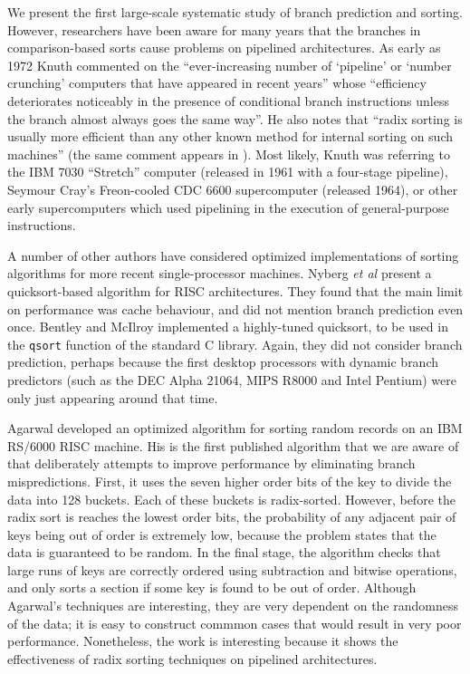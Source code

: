\documentclass[acmtocl]{acmtrans2m}
\begin{document}
We present the first large-scale systematic study of branch prediction
and sorting. However, researchers have been aware for many years that
the branches in comparison-based sorts cause problems on pipelined
architectures. As early as 1972 Knuth commented on the
``ever-increasing number of `pipeline' or `number crunching' computers
that have appeared in recent years'' whose ``efficiency deteriorates
noticeably in the presence of conditional branch instructions unless
the branch almost always goes the same way''. He also notes that ``radix
sorting is usually more efficient than any other known method for
internal sorting on such machines'' (the same comment appears in \cite{KnuthVol3_98}). Most likely, Knuth
was referring to the IBM 7030 ``Stretch'' computer (released in 1961
with a four-stage pipeline), Seymour Cray's Freon-cooled CDC 6600
supercomputer (released 1964), or other early supercomputers which
used pipelining in the execution of general-purpose instructions.

A number of other authors have considered optimized implementations of
sorting algorithms for more recent single-processor machines. Nyberg
\textit{et al} \citeyear{Nyberg+94} present a quicksort-based algorithm for RISC
architectures. They found that the main limit on
performance was cache behaviour, and did not mention branch prediction
even once. Bentley and McIlroy \citeyear{Bentley+93} implemented a highly-tuned quicksort,
to be used in the \texttt{qsort} function of the standard C library. Again, they did not consider branch prediction,
perhaps because the first desktop processors with dynamic branch
predictors (such as the DEC Alpha 21064, MIPS R8000 and Intel Pentium)
were only just appearing around that time.

Agarwal \citeyear{Agarwal96} developed an optimized algorithm for sorting random records on
an IBM RS/6000 RISC machine. His is the first
published algorithm that we are aware of that deliberately attempts to
improve performance by eliminating branch mispredictions. First, it
uses the seven higher order bits of the key to divide the data into
128 buckets. Each of these buckets is radix-sorted. However, before
the radix sort is reaches the lowest order bits, the probability of
any adjacent pair of keys being out of order is extremely low, because
the problem states that the data is guaranteed to be random. In the
final stage, the algorithm checks that large runs of keys are
correctly ordered using subtraction and bitwise operations, and only
sorts a section if some key is found to be out of order. Although
Agarwal's techniques are interesting, they are very dependent on the
randomness of the data; it is easy to construct commmon cases that
would result in very poor performance. Nonetheless, the work is
interesting because it shows the effectiveness of radix sorting
techniques on pipelined architectures.
\end{document}
